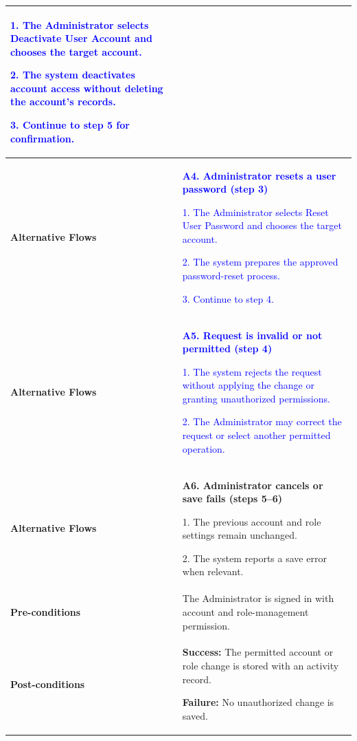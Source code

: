 \begin{longtable}{|p{}|p{}|}
\textcolor{blue}{1. The Administrator selects Deactivate User Account and chooses the target account.}\par
\textcolor{blue}{2. The system deactivates account access without deleting the account's records.}\par
\textcolor{blue}{3. Continue to step 5 for confirmation.}
\\ \hline
\textbf{Alternative Flows} &
\textcolor{blue}{\textbf{A4. Administrator resets a user password (step 3)}}\par
\textcolor{blue}{1. The Administrator selects Reset User Password and chooses the target account.}\par
\textcolor{blue}{2. The system prepares the approved password-reset process.}\par
\textcolor{blue}{3. Continue to step 4.}
\\ \hline
\textbf{Alternative Flows} &
\textcolor{blue}{\textbf{A5. Request is invalid or not permitted (step 4)}}\par
\textcolor{blue}{1. The system rejects the request without applying the change or granting unauthorized permissions.}\par
\textcolor{blue}{2. The Administrator may correct the request or select another permitted operation.}
\\ \hline
\textbf{Alternative Flows} &
\textbf{A6. Administrator cancels or save fails (steps 5--6)}\par
1. The previous account and role settings remain unchanged.\par
2. The system reports a save error when relevant.
\\ \hline
\textbf{Pre-conditions} &
The Administrator is signed in with account and role-management permission.
\\ \hline
\textbf{Post-conditions} &
\textbf{Success:} The permitted account or role change is stored with an activity record.\par
\textbf{Failure:} No unauthorized change is saved.
\\ \hline
\end{longtable}
\clearpage
